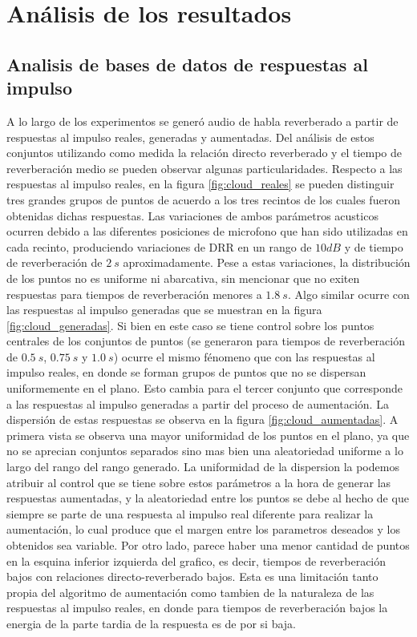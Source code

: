 \section{Análisis de los resultados}

\subsection{Analisis de bases de datos de respuestas al impulso}
A lo largo de los experimentos se generó audio de habla reverberado a partir de respuestas al impulso reales, generadas y aumentadas. Del análisis de estos conjuntos utilizando como medida la relación directo reverberado  y el tiempo de reverberación medio se pueden observar algunas particularidades. Respecto a las respuestas al impulso reales, en la figura \ref{fig:cloud_reales} se pueden distinguir tres grandes grupos de puntos de acuerdo a los tres recintos de los cuales fueron obtenidas dichas respuestas. Las variaciones de ambos parámetros acusticos ocurren debido a las diferentes posiciones de microfono que han sido utilizadas en cada recinto, produciendo variaciones de DRR en un rango de $10 dB$ y de tiempo de reverberación de $2 \ s$ aproximadamente. Pese a estas variaciones, la distribución de los puntos no es uniforme ni abarcativa, sin mencionar que no exiten respuestas para tiempos de reverberación menores a $1.8 \ s$. Algo similar ocurre con las respuestas al impulso generadas que se muestran en la figura \ref{fig:cloud_generadas}. Si bien en este caso se tiene control sobre los puntos centrales de los conjuntos de puntos (se generaron para tiempos de reverberación de $0.5 \ s$, $0.75 \ s$ y $1.0 \ s$) ocurre el mismo fénomeno que con las respuestas al impulso reales, en donde se forman grupos de puntos que no se dispersan uniformemente en el plano. Esto cambia para el tercer conjunto que corresponde a las respuestas al impulso generadas a partir del proceso de aumentación. La dispersión de estas respuestas se observa en la figura \ref{fig:cloud_aumentadas}. A primera vista se observa una mayor uniformidad de los puntos en el plano, ya que no se aprecian conjuntos separados sino mas bien una aleatoriedad uniforme a lo largo del rango del rango generado. La uniformidad de la dispersion la podemos atribuir al control que se tiene sobre estos parámetros a la hora de generar las respuestas aumentadas, y la aleatoriedad entre los puntos se debe al hecho de que siempre se parte de una respuesta al impulso real diferente para realizar la aumentación, lo cual produce que el margen entre los parametros deseados y los obtenidos sea variable. Por otro lado, parece haber una menor cantidad de puntos en la esquina inferior izquierda del grafico, es decir, tiempos de reverberación bajos con relaciones directo-reverberado bajos. Esta es una limitación tanto propia del algoritmo de aumentación como tambien de la naturaleza de las respuestas al impulso reales, en donde para tiempos de reverberación bajos la energia de la parte tardia de la respuesta es de por si baja. 

